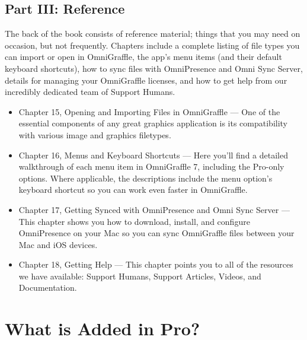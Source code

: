 \documentclass[../main.tex]{subfiles}
\begin{document}
\subsection*{Part III: Reference}

The back of the book consists of reference material; things that you may need on occasion, but
not frequently. Chapters include a complete listing of file types you can import or open in
OmniGraffle, the app's menu items (and their default keyboard shortcuts), how to sync files
with OmniPresence and Omni Sync Server, details for managing your OmniGraffle licenses, and
how to get help from our incredibly dedicated team of Support Humans.

\begin{itemize}
  \item Chapter 15, Opening and Importing Files in OmniGraffle --- One of the essential
    components of any great graphics application is its compatibility with various image and
    graphics filetypes.
  \item Chapter 16, Menus and Keyboard Shortcuts --- Here you'll find a detailed walkthrough of
    each menu item in OmniGraffle 7, including the Pro-only options. Where applicable, the
    descriptions include the menu option's keyboard shortcut so you can work even faster in
    OmniGraffle.
  \item Chapter 17, Getting Synced with OmniPresence and Omni Sync Server --- This chapter shows
    you how to download, install, and configure OmniPresence on your Mac so you can sync
    OmniGraffle files between your Mac and iOS devices.
  \item Chapter 18, Getting Help --- This chapter points you to all of the resources we have
    available: Support Humans, Support Articles, Videos, and Documentation.
\end{itemize}

\section*{What is Added in Pro?}
\end{document}
